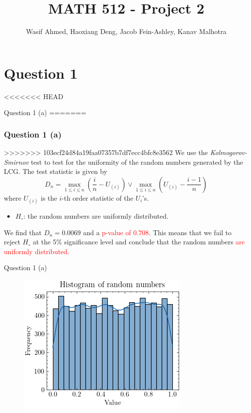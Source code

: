 \documentclass[compress,12pt]{beamer}
\title{MATH 512 - Project 2}
\subtitle{}
\date{}
\author{Wasif Ahmed, Haoxiang Deng, Jacob Fein-Ashley, Kanav Malhotra}
\newcommand{\myRed}[1]{\textcolor{red}{#1}}
\begin{document}
\frame[plain]{\titlepage}

\section{Question 1}

<<<<<<< HEAD
\begin{frame}{Question 1 (a)}
=======
\begin{frame}
      \frametitle{Question 1 (a)}
>>>>>>> 103ecf24d84a19faa07357b7df7ecc4bfc8e3562
      We use the \emph{Kolmogorov-Smirnov} test to test for the uniformity of the random numbers generated by the LCG. The test statistic is given by
      \begin{equation*}
            D_n = \max_{1 \leq i \leq n} \left( \frac{i}{n} - U_{(i)} \right) \vee \max_{1 \leq i \leq n} \left( U_{(i)} - \frac{i-1}{n} \right)
      \end{equation*}
      where $U_{(i)}$ is the $i$-th order statistic of the $U_i$'s. 
      
      \begin{itemize}
            \item $H_{\circ}$: the random numbers are uniformly distributed. 
      \end{itemize}
      
    \begin{tcolorbox}
      We find that $D_n = 0.0069$ and a \myRed{p-value of $0.708$}. This means that we fail to reject $H_{\circ}$ at the 5\% significance level and conclude that the random numbers \myRed{are uniformly distributed.}
    \end{tcolorbox}
\end{frame}

\begin{frame}{Question 1 (a)}
      \begin{figure}
            \centering
            \includegraphics[scale=0.7]{imgs/1a.png}
      \end{figure}
\end{frame}


\end{frame}
\end{document}
